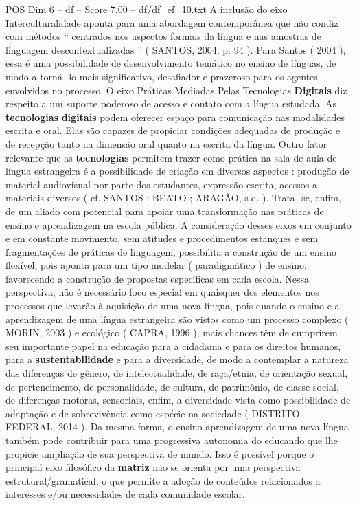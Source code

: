 \begin{textsample}{POS Dim 6 – df – Score 7.00 – df/df\_ef\_10.txt}
A inclusão do eixo Interculturalidade aponta para uma abordagem contemporânea que não condiz com métodos “ centrados nos aspectos formais da língua e nas amostras de linguagem descontextualizadas ” ( SANTOS, 2004, p. 94 ).
Para Santos ( 2004 ), essa é uma possibilidade de desenvolvimento temático no ensino de línguas, de modo a torná -lo mais significativo, desafiador e prazeroso para os agentes envolvidos no processo.
O eixo Práticas Mediadas Pelas Tecnologias \textbf{Digitais} diz respeito a um suporte poderoso de acesso e contato com a língua estudada.
As \textbf{tecnologias} \textbf{digitais} podem oferecer espaço para comunicação nas modalidades escrita e oral.
Elas são capazes de propiciar condições adequadas de produção e de recepção tanto na dimensão oral quanto na escrita da língua.
Outro fator relevante que as \textbf{tecnologias} permitem trazer como prática na sala de aula de língua estrangeira é a possibilidade de criação em diversos aspectos : produção de material audiovisual por parte dos estudantes, expressão escrita, acessos a materiais diversos ( cf.
SANTOS ; BEATO ; ARAGÃO, s.d. ).
Trata -se, enfim, de um aliado com potencial para apoiar uma transformação nas práticas de ensino e aprendizagem na escola pública.
A consideração desses eixos em conjunto e em constante movimento, sem atitudes e procedimentos estanques e sem fragmentações de práticas de linguagem, possibilita a construção de um ensino flexível, pois aponta para um tipo modelar ( paradigmático ) de ensino, favorecendo a construção de propostas específicas em cada escola.
Nessa perspectiva, não é necessário foco especial em quaisquer dos elementos nos processos que levarão à aquisição de uma nova língua, pois quando o ensino e a aprendizagem de uma língua estrangeira são vistos como um processo complexo ( MORIN, 2003 ) e ecológico ( CAPRA, 1996 ), mais chances têm de cumprirem seu importante papel na educação para a cidadania e para os direitos humanos, para a \textbf{sustentabilidade} e para a diversidade, de modo a contemplar a natureza das diferenças de gênero, de intelectualidade, de raça/etnia, de orientação sexual, de pertencimento, de personalidade, de cultura, de patrimônio, de classe social, de diferenças motoras, sensoriais, enfim, a diversidade vista como possibilidade de adaptação e de sobrevivência como espécie na sociedade ( DISTRITO FEDERAL, 2014 ).
Da mesma forma, o ensino-aprendizagem de uma nova língua também pode contribuir para uma progressiva autonomia do educando que lhe propicie ampliação de sua perspectiva de mundo.
Isso é possível porque o principal eixo filosófico da \textbf{matriz} não se orienta por uma perspectiva estrutural/gramatical, o que permite a adoção de conteúdos relacionados a interesses e/ou necessidades de cada comunidade escolar.

\end{textsample}
